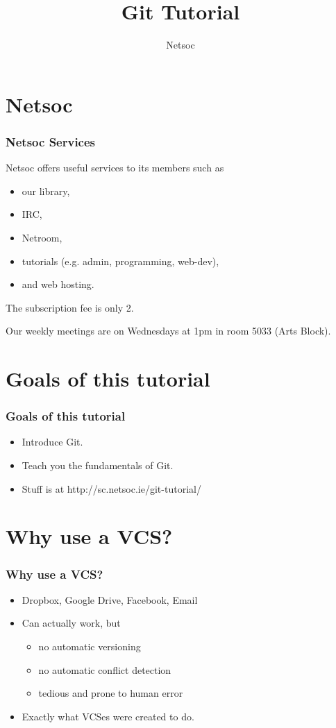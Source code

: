 \documentclass{beamer}
\title{Git Tutorial}
\author{Netsoc}
\date{}
\begin{document}
\frame{\titlepage}


\section{Netsoc}
\begin{frame}
\frametitle{Netsoc Services}
Netsoc offers useful services to its members such as
\begin{itemize}
	\pause
	\item our library,
	\pause
	\item IRC,
	\pause
	\item Netroom,
	\pause
	\item tutorials (e.g. admin, programming, web-dev),
	\pause
	\item and web hosting.
\end{itemize}
\pause

The subscription fee is only \EUR{}2.

\pause

Our weekly meetings are on Wednesdays at 1pm in room 5033 (Arts Block).
\end{frame}


\section{Goals of this tutorial}
\begin{frame}
\frametitle{Goals of this tutorial}
\begin{itemize}
\pause
\item Introduce Git.
\pause
\item Teach you the fundamentals of Git.
\pause
\item Stuff is at http://sc.netsoc.ie/git-tutorial/
\end{itemize}
\end{frame}


\section{Why use a VCS?}
\begin{frame}
\frametitle{Why use a VCS?}
\begin{itemize}
\pause
\item Dropbox, Google Drive, Facebook, Email
\pause
\item Can actually work, but
	\begin{itemize}
	\pause
	\item no automatic versioning
	\pause
	\item no automatic conflict detection
	\pause
	\item tedious and prone to human error
	\end{itemize}
\pause
\item Exactly what VCSes were created to do.
\end{itemize}
\end{frame}
\end{document}
